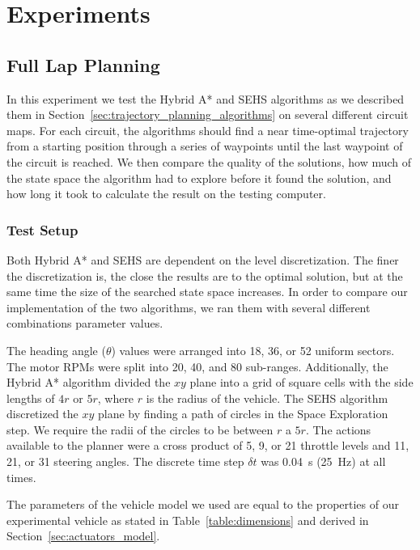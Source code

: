 \chapter{Experiments}
\label{chapter:experiments}

\section{Full Lap Planning}

In this experiment we test the Hybrid A* and \gls{SEHS} algorithms as we described them in Section~\ref{sec:trajectory_planning_algorithms} on several different circuit maps. For each circuit, the algorithms should find a near time-optimal trajectory from a starting position through a series of waypoints until the last waypoint of the circuit is reached. We then compare the quality of the solutions, how much of the state space the algorithm had to explore before it found the solution, and how long it took to calculate the result on the testing computer.

\subsection{Test Setup}

Both Hybrid A* and \gls*{SEHS} are dependent on the level discretization. The finer the discretization is, the close the results are to the optimal solution, but at the same time the size of the searched state space increases. In order to compare our implementation of the two algorithms, we ran them with several different combinations parameter values.

The heading angle ($\theta$) values were arranged into \num{18}, \num{36}, or \num{52} uniform sectors. The motor \gls*{RPM}s were split into \num{20}, \num{40}, and \num{80} sub-ranges. Additionally, the Hybrid A* algorithm divided the $xy$ plane into a grid of square cells with the side lengths of $4r$ or $5r$, where $r$ is the radius of the vehicle. The \gls*{SEHS} algorithm discretized the $xy$ plane by finding a path of circles in the Space Exploration step. We require the radii of the circles to be between $r$ a $5r$. The actions available to the planner were a cross product of \num{5}, \num{9}, or \num{21} throttle levels and \num{11}, \num{21}, or \num{31} steering angles. The discrete time step $\delta t$ was \SI{0.04}{\second} (\SI{25}{\hertz}) at all times.

The parameters of the vehicle model we used are equal to the properties of our experimental vehicle as stated in Table~\ref{table:dimensions} and derived in Section~\ref{sec:actuators_model}. 

